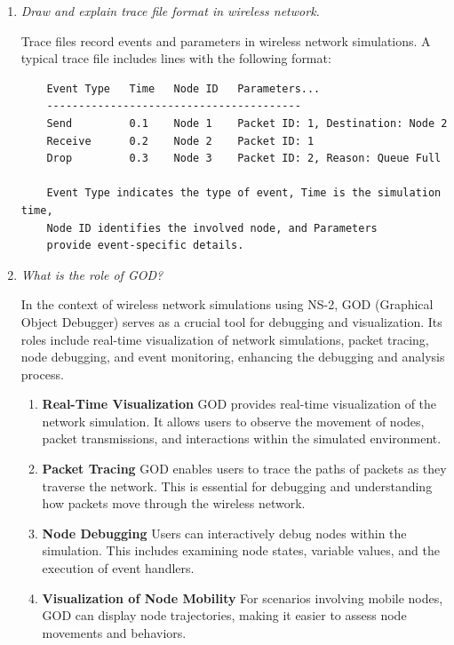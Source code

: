 \documentclass[11pt]{article}
\begin{document}
\begin{enumerate}
    \item \textit{Draw and explain trace file format in wireless network.}

          Trace files record events and parameters in wireless network simulations. A typical trace file includes lines with the following format:

          \begin{verbatim}
    Event Type   Time   Node ID   Parameters...
    ----------------------------------------
    Send         0.1    Node 1    Packet ID: 1, Destination: Node 2
    Receive      0.2    Node 2    Packet ID: 1
    Drop         0.3    Node 3    Packet ID: 2, Reason: Queue Full
    
    Event Type indicates the type of event, Time is the simulation time,
    Node ID identifies the involved node, and Parameters
    provide event-specific details.
    \end{verbatim}

    \item \textit{What is the role of GOD?}

          In the context of wireless network simulations using NS-2, GOD (Graphical Object Debugger) serves as a crucial tool for debugging and visualization. Its roles include real-time visualization of network simulations, packet tracing, node debugging, and event monitoring, enhancing the debugging and analysis process.

          \begin{enumerate}
              \item \textbf{Real-Time Visualization} GOD provides real-time visualization of the network simulation. It allows users to observe the movement of nodes, packet transmissions, and interactions within the simulated environment.

              \item \textbf{Packet Tracing} GOD enables users to trace the paths of packets as they traverse the network. This is essential for debugging and understanding how packets move through the wireless network.

              \item \textbf{Node Debugging} Users can interactively debug nodes within the simulation. This includes examining node states, variable values, and the execution of event handlers.

              \item \textbf{Visualization of Node Mobility} For scenarios involving mobile nodes, GOD can display node trajectories, making it easier to assess node movements and behaviors.


\end{enumerate}
\end{enumerate}
\end{document}
